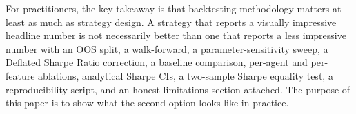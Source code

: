 \documentclass{article}
\begin{document}
For practitioners, the key takeaway is that backtesting methodology matters at least as much as strategy design.
A strategy that reports a visually impressive headline number is not necessarily better than one that reports a less impressive number with an OOS split, a walk-forward, a parameter-sensitivity sweep, a Deflated Sharpe Ratio correction, a baseline comparison, per-agent and per-feature ablations, analytical Sharpe CIs, a two-sample Sharpe equality test, a reproducibility script, and an honest limitations section attached.
The purpose of this paper is to show what the second option looks like in practice.

\small


\end{document}
